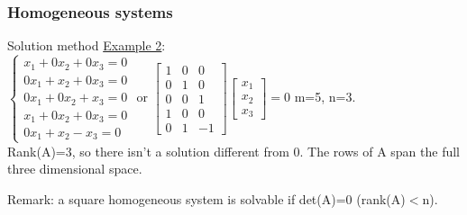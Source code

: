 \begin{frame}
	\frametitle{Homogeneous systems}
	\begin{block}{Solution method}
		\underline{Example 2}:\\
		$\begin{cases}
		x_1+0x_2+0x_3=0\\
		0x_1+x_2+0x_3=0\\
		0x_1+0x_2+x_3=0\\
		x_1+0x_2+0x_3=0\\
		0x_1+x_2-x_3=0
		\end{cases}$ or $\begin{bmatrix}
		1 & 0 & 0\\
		0 & 1 & 0\\
		0 & 0 & 1\\
		1 & 0 & 0\\
		0 & 1 & -1
		\end{bmatrix} \begin{bmatrix}
		x_1\\x_2\\x_3
		\end{bmatrix}=0$ \hspace{0.4cm} m=5, n=3.\\
		Rank(A)=3, so there isn't a solution different from 0. The rows of A span the full three dimensional space. \vspace{4mm}
		
		Remark: a square homogeneous system is solvable if det(A)=0 (rank(A)$<$n).
	\end{block}
\end{frame}


